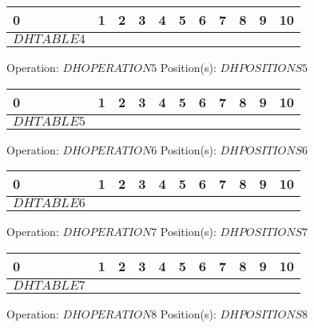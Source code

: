 {{\begin{center}
\begin{tabular}{|P{0.75cm}|P{0.75cm}|P{0.75cm}|P{0.75cm}|P{0.75cm}|P{0.75cm}|P{0.75cm}|P{0.75cm}|P{0.75cm}|P{0.75cm}|P{0.75cm}|}
                 & 1 & 2 & 3 & 4 & 5 & 6 & 7 & 8 & 9 & 10  \\
                \hline
                $DHTABLE4$&&&&&&&&&& \\
                \hline
            \end{tabular}
        \end{center}Operation: \underline{$DHOPERATION5$} \hspace{10px} Position(s): \underline{$DHPOSITIONS5$}
        \begin{center}
            \begin{tabular}{|P{0.75cm}|P{0.75cm}|P{0.75cm}|P{0.75cm}|P{0.75cm}|P{0.75cm}|P{0.75cm}|P{0.75cm}|P{0.75cm}|P{0.75cm}|P{0.75cm}|}
                 & 1 & 2 & 3 & 4 & 5 & 6 & 7 & 8 & 9 & 10  \\
                \hline
                $DHTABLE5$&&&&&&&&&& \\
                \hline
            \end{tabular}
        \end{center}Operation: \underline{$DHOPERATION6$} \hspace{10px} Position(s): \underline{$DHPOSITIONS6$}
        \begin{center}
            \begin{tabular}{|P{0.75cm}|P{0.75cm}|P{0.75cm}|P{0.75cm}|P{0.75cm}|P{0.75cm}|P{0.75cm}|P{0.75cm}|P{0.75cm}|P{0.75cm}|P{0.75cm}|}
                 & 1 & 2 & 3 & 4 & 5 & 6 & 7 & 8 & 9 & 10  \\
                \hline
                $DHTABLE6$&&&&&&&&&& \\
                \hline
            \end{tabular}
        \end{center}Operation: \underline{$DHOPERATION7$} \hspace{10px} Position(s): \underline{$DHPOSITIONS7$}
        \begin{center}
            \begin{tabular}{|P{0.75cm}|P{0.75cm}|P{0.75cm}|P{0.75cm}|P{0.75cm}|P{0.75cm}|P{0.75cm}|P{0.75cm}|P{0.75cm}|P{0.75cm}|P{0.75cm}|}
                 & 1 & 2 & 3 & 4 & 5 & 6 & 7 & 8 & 9 & 10  \\
                \hline
                $DHTABLE7$&&&&&&&&&& \\
                \hline
            \end{tabular}
        \end{center}Operation: \underline{$DHOPERATION8$} \hspace{10px} Position(s): \underline{$DHPOSITIONS8$}
}}
